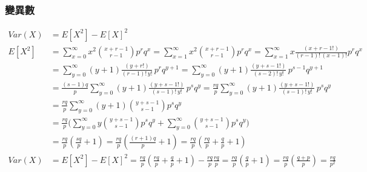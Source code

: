 \documentclass{article}
\begin{document}
\subsubsection{變異數}
\begin{align*}
Var(X)
& = E[X^2]-E[X]^2 \\
E[X^2] & = \sum_{x=0}^\infty{x^2\binom{x+r-1}{r-1}p^r q^x}
  = \sum_{x=1}^\infty{x^2\binom{x+r-1}{r-1}p^r q^x}
  = \sum_{x=1}^\infty{x\frac{(x+r-1!)}{(r-1)!\,(x-1)!}p^r q^x} \\
& = \sum_{y=0}^\infty{(y+1)\frac{(y+r!)}{(r-1)!\,y!}\,p^r q^{y+1}}
  = \sum_{y=0}^\infty{(y+1)\frac{(y+s-1!)}{(s-2)!\,y!}\,p^{s-1} q^{y+1}} \\
& = \frac{(s-1)q}{p}\sum_{y=0}^\infty{(y+1)\frac{(y+s-1!)}{(s-1)!\,y!}\,p^s q^y}
  = \frac{rq}{p}\sum_{y=0}^\infty{(y+1)\frac{(y+s-1!)}{(s-1)!\,y!}\,p^s q^y} \\
& = \frac{rq}{p}\sum_{y=0}^\infty{(y+1)\binom{y+s-1}{s-1}p^s q^y} \\
& = \frac{rq}{p}\bigg(
  \sum_{y=0}^\infty{y\binom{y+s-1}{s-1}p^s q^y} +
  \sum_{y=0}^\infty{\binom{y+s-1}{s-1}p^s q^y}\bigg) \\
& = \frac{rq}{p}(\frac{sq}{p}+1)
  = \frac{rq}{p}(\frac{(r+1)q}{p}+1)
  = \frac{rq}{p}(\frac{rq}{p}+\frac{q}{p}+1) \\
Var(X) & = E[X^2]-E[X]^2
  = \frac{rq}{p}(\frac{rq}{p}+\frac{q}{p}+1) - \frac{rq}{p}\frac{rq}{p}
  = \frac{rq}{p}(\frac{q}{p}+1)
  = \frac{rq}{p}(\frac{q+p}{p})
  = \frac{rq}{p^2}
\end{align*}

\clearpage
\end{document}
